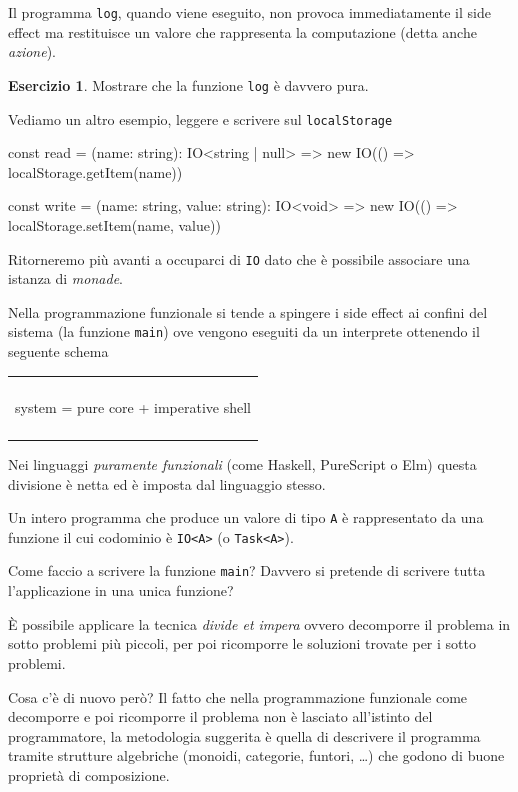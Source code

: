 \documentclass[12pt]{article}
\theoremstyle{definition}
\newtheorem{exercise}{Esercizio}[section]
\newenvironment{demo}
    {\begin{center}
    \begin{tabular}{|p{0.9\textwidth}|}
    \hline\\
    }
    {
    \\\\\hline
    \end{tabular}
    \end{center}
    }
\newenvironment{code}
  {\vspace{0.5cm} \VerbatimEnvironment\begin{typescriptcode}}
  {\end{typescriptcode} \vspace{0.2cm}}
\begin{document}
Il programma \texttt{log}, quando viene eseguito, non provoca immediatamente il side effect ma restituisce un valore che rappresenta
la computazione (detta anche \emph{azione}).

\begin{exercise}
Mostrare che la funzione \texttt{log} è davvero pura.
\end{exercise}

Vediamo un altro esempio, leggere e scrivere sul \texttt{localStorage}

\begin{code}
const read = (name: string): IO<string | null> =>
  new IO(() => localStorage.getItem(name))

const write = (name: string, value: string): IO<void> =>
  new IO(() => localStorage.setItem(name, value))
\end{code}

Ritorneremo più avanti a occuparci di \texttt{IO} dato che è possibile associare una istanza di \emph{monade}.

Nella programmazione funzionale si tende a spingere i side effect ai confini del sistema (la funzione \texttt{main})
ove vengono eseguiti da un interprete ottenendo il seguente schema

\begin{demo}
\begin{center}
system = pure core + imperative shell
\end{center}
\end{demo}

Nei linguaggi \emph{puramente funzionali} (come Haskell, PureScript o Elm) questa divisione è netta ed è imposta dal linguaggio stesso.

Un intero programma che produce un valore di tipo \texttt{A} è rappresentato da una funzione il cui codominio è \texttt{IO<A>} (o \texttt{Task<A>}).

Come faccio a scrivere la funzione \texttt{main}? Davvero si pretende di scrivere tutta l'applicazione in una unica funzione?

È possibile applicare la tecnica \emph{divide et impera} ovvero decomporre il problema in sotto problemi più piccoli,
per poi ricomporre le soluzioni trovate per i sotto problemi.

Cosa c'è di nuovo però? Il fatto che nella programmazione funzionale come decomporre e poi ricomporre il problema non è lasciato
all'istinto del programmatore, la metodologia suggerita è quella di descrivere il programma tramite strutture algebriche
(monoidi, categorie, funtori, \ldots) che godono di buone proprietà di composizione.
\end{document}
